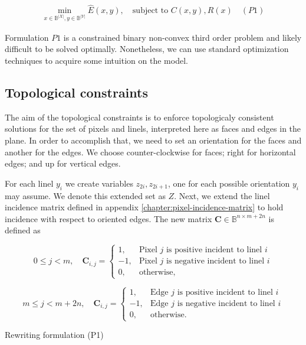 \begin{align*}
	\min_{x \in \mathbb{B}^{|X|}, y \in \mathbb{B}^{|Y|}}{\hat{E}(x,y)}, \quad \text{subject to } C(x,y), R(x) \quad (P1)
\end{align*}

	Formulation $P1$ is a constrained binary non-convex third order problem and likely difficult to be solved optimally. Nonetheless, we can use standard optimization techniques to acquire some intuition on the model. 	
	
\subsection{Topological constraints}



The aim of the topological constraints is to enforce topologicaly consistent solutions for the set of pixels and linels, interpreted here as faces and edges in the plane. In order to accomplish that, we need to set an orientation for the faces and another for the edges. We choose counter-clockwise for faces; right for horizontal edges; and up for vertical edges.


For each linel $y_i$ we create variables $z_{2i},z_{2i+1}$, one for each possible orientation $y_i$ may assume. We denote this extended set as $Z$. Next, we extend the linel incidence matrix defined in appendix \ref{chapter:pixel-incidence-matrix} to hold incidence with respect to oriented edges. The new matrix $\mathbf{C} \in \mathbb{B}^{n \times m + 2n}$ is defined as

\[
	0 \leq j < m, \quad \mathbf{C}_{i,j} = \left\{ \begin{array}{ll}
	
	1,& \text{Pixel $j$ is positive incident to linel $i$}\\
	-1,& \text{Pixel $j$ is negative incident to linel $i$}\\	
	0,& \text{otherwise},
	\end{array}\right.
\]

\[
	m \leq j < m + 2n, \quad \mathbf{C}_{i,j} = \left\{ \begin{array}{ll}
	
	1,& \text{Edge $j$ is positive incident to linel $i$}\\
	-1,& \text{Edge $j$ is negative incident to linel $i$}\\	
	0,& \text{otherwise}.
	\end{array}\right.
\]

Rewriting formulation (P1)

